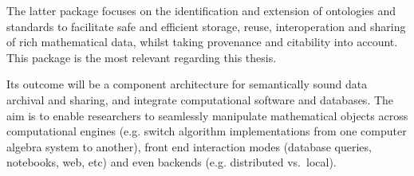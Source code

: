 The latter package focuses on the identification and extension of ontologies and standards
to facilitate safe and efficient storage, reuse, interoperation and sharing of rich mathematical
data, whilst taking provenance and citability into account. This package is the most relevant regarding
this thesis.

Its outcome will be a component architecture for semantically sound data archival and sharing,
and integrate computational software and databases. The aim is to enable researchers to seamlessly
manipulate mathematical objects across computational engines (e.g. switch algorithm implementations
from one computer algebra system to another), front end interaction modes (database queries, notebooks,
web, etc) and even backends (e.g. distributed vs.~local).




